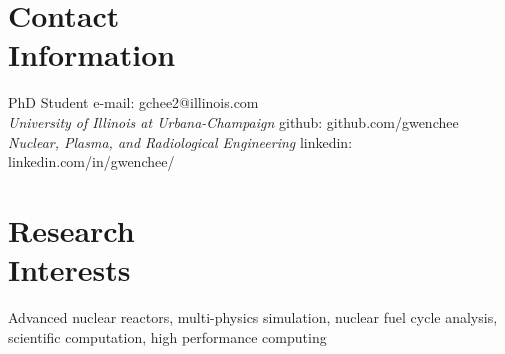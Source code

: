 \documentclass[margin,line]{resume}
\begin{document}
\begin{resume}

    \section{\mysidestyle Contact\\Information}
   PhD Student  \hfill e-mail: gchee2@illinois.com \vspace{0mm}\\\vspace{0mm}%
        \textsl{University of Illinois at Urbana-Champaign}
        \hfill github: github.com/gwenchee           \vspace{0mm}\\\vspace{0mm}%
    \textsl{Nuclear, Plasma, and Radiological Engineering}
        \hfill linkedin: linkedin.com/in/gwenchee/    \vspace{0mm}
    \section{\mysidestyle Research\\Interests}
		Advanced nuclear reactors, multi-physics
                simulation, nuclear fuel cycle analysis,
                scientific computation, high performance computing

\end{resume}
\end{document}

